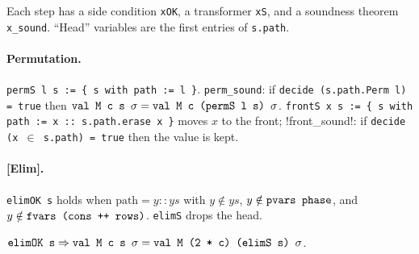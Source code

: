 Each step has a side condition \textnormal{\texttt{xOK}}, a transformer \textnormal{\texttt{xS}}, and a soundness theorem
\textnormal{\texttt{x\_\allowbreak{}sound}}. ``Head'' variables are the first entries of \textnormal{\texttt{s.\allowbreak{}path}}.

\paragraph{Permutation.} \textnormal{\texttt{permS l s := \{ s with path := l \}}}. \textnormal{\texttt{perm\_\allowbreak{}sound}}: if
\textnormal{\texttt{decide (\allowbreak{}s.\allowbreak{}path.\allowbreak{}Perm l) = true}} then $\textnormal{\texttt{val M c s \ensuremath{\sigma}}} = \textnormal{\texttt{val M c (\allowbreak{}permS l s) \ensuremath{\sigma}}}$.
\textnormal{\texttt{frontS x s := \{ s with path := x :: s.path.erase x \}}} moves $x$ to the front;
\lean!front_sound!: if \textnormal{\texttt{decide (x \ensuremath{\in} s.path) = true}} then the value is kept.

\paragraph{[Elim].} \textnormal{\texttt{elimOK s}} holds when $\text{path} = y :: ys$ with $y\notin ys$,
$y\notin\textnormal{\texttt{pvars phase}}$, and $y\notin\textnormal{\texttt{fvars (\allowbreak{}cons ++ rows)}}$. \textnormal{\texttt{elimS}} drops the head.
\begin{theorem}
$\textnormal{\texttt{elimOK s}}\Rightarrow \textnormal{\texttt{val M c s \ensuremath{\sigma}}} = \textnormal{\texttt{val M (\allowbreak{}2 * c) (\allowbreak{}elimS s) \ensuremath{\sigma}}}$.
\end{theorem}

